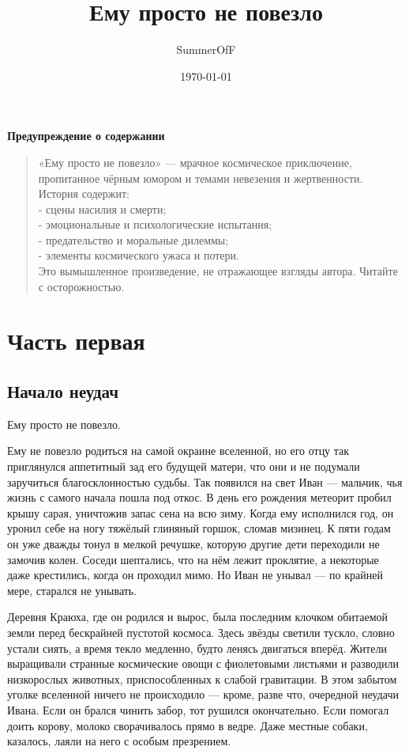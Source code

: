 \documentclass[12pt,a4paper]{book} %
\title{Ему просто не повезло}
\author{SummerOfF}
\date{\today}
\begin{document}
\maketitle
\clearpage

\begin{center}
    \vspace*{5cm}
    {\LARGE \textbf{Предупреждение о содержании}} \\[1cm]
\end{center}
\begin{quote}
    «Ему просто не повезло» — мрачное космическое приключение, пропитанное чёрным юмором и темами невезения и жертвенности. История содержит: \\
    - сцены насилия и смерти; \\
    - эмоциональные и психологические испытания; \\
    - предательство и моральные дилеммы; \\
    - элементы космического ужаса и потери. \\
    Это вымышленное произведение, не отражающее взгляды автора. Читайте с осторожностью.
\end{quote}
\clearpage

\tableofcontents
\clearpage

\part{Часть первая}
\chapter{Начало неудач}

Ему просто не повезло.

Ему не повезло родиться на самой окраине вселенной, но его отцу так приглянулся аппетитный зад его будущей матери, что они и не подумали заручиться благосклонностью судьбы. Так появился на свет Иван --- мальчик, чья жизнь с самого начала пошла под откос. В день его рождения метеорит пробил крышу сарая, уничтожив запас сена на всю зиму. Когда ему исполнился год, он уронил себе на ногу тяжёлый глиняный горшок, сломав мизинец. К пяти годам он уже дважды тонул в мелкой речушке, которую другие дети переходили не замочив колен. Соседи шептались, что на нём лежит проклятие, а некоторые даже крестились, когда он проходил мимо. Но Иван не унывал --- по крайней мере, старался не унывать.

Деревня Краюха, где он родился и вырос, была последним клочком обитаемой земли перед бескрайней пустотой космоса. Здесь звёзды светили тускло, словно устали сиять, а время текло медленно, будто ленясь двигаться вперёд. Жители выращивали странные космические овощи с фиолетовыми листьями и разводили низкорослых животных, приспособленных к слабой гравитации. В этом забытом уголке вселенной ничего не происходило --- кроме, разве что, очередной неудачи Ивана. Если он брался чинить забор, тот рушился окончательно. Если помогал доить корову, молоко сворачивалось прямо в ведре. Даже местные собаки, казалось, лаяли на него с особым презрением.
\end{document}
